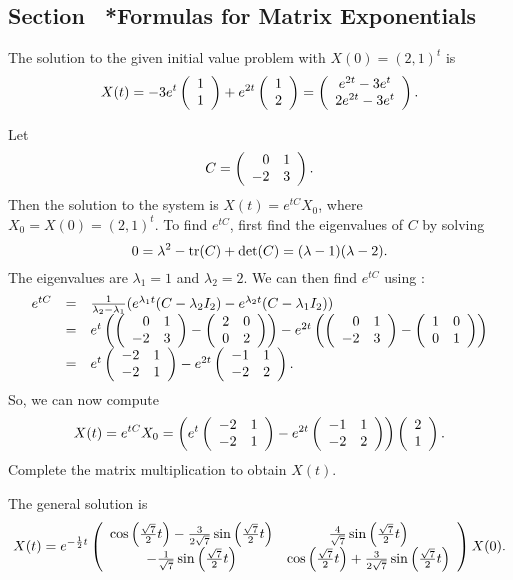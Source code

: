 \subsection*{Section~\protect{\ref{S:6.6}} *Formulas for Matrix Exponentials}

\ans The solution to the given initial value problem with $X(0) = (2,1)^t$
is
\[
X(t) = -3e^t\left(\begin{array}{r} 1 \\ 1\end{array}\right) + e^{2t}\left(\begin{array}{r} 1 \\ 2\end{array}\right)
= \left(\begin{array}{c} e^{2t} - 3e^t \\ 2e^{2t} - 3e^t\end{array}\right).
\]

\soln Let \[ C = \left(\begin{array}{rr} 0 & 1\\ -2 &3\end{array}\right). \]
Then the solution to the system is $X(t) = e^{tC}X_0$, where
$X_0 = X(0) = (2,1)^t$.
To find $e^{tC}$, first find the eigenvalues of $C$ by solving
\[
0 = \lambda^2 - {\rm tr}(C) + \det(C) = (\lambda - 1)(\lambda - 2).
\]
The eigenvalues are $\lambda_1 = 1$ and $\lambda_2 = 2$.  We can
then find $e^{tC}$ using :
\[
\begin{array}{rcl}
e^{tC} & = & \frac{1}{\lambda_2 - \lambda_1}(e^{\lambda_1 t}(C -
\lambda_2 I_2) - e^{\lambda_2 t}(C - \lambda_1 I_2)) \\
& = & e^t\left(\left(\begin{array}{rr} 0 & 1\\ -2 &3\end{array}\right) - \left(\begin{array}{rr} 2 & 0\\ 0 &2\end{array}\right)\right) -
e^{2t}\left(\left(\begin{array}{rr} 0 & 1\\ -2 &3\end{array}\right) - \left(\begin{array}{rr} 1 & 0\\ 0 &1\end{array}\right)\right) \\
& = &
e^t\left(\begin{array}{rr} -2 & 1\\ -2 &1\end{array}\right) - e^{2t}\left(\begin{array}{rr} -1 & 1\\ -2 &2\end{array}\right).
\end{array}
\]
So, we can now compute
\[
X(t) = e^{tC}X_0
= \left(e^t\left(\begin{array}{rr} -2 & 1\\ -2 &1\end{array}\right) -
e^{2t}\left(\begin{array}{rr} -1 & 1\\ -2 &2\end{array}\right)\right)\left(\begin{array}{r} 2 \\ 1\end{array}\right).
\]
Complete the matrix multiplication to obtain $X(t)$.

\ans The general solution is
\[
X(t) = e^{-\frac{1}{2}t}\left(\begin{array}{cc} \cos\left({\frac{\sqrt{7}}{2}t}\right) -
\frac{3}{2\sqrt{7}}\sin\left({\frac{\sqrt{7}}{2}t}\right) & \frac{4}{\sqrt{7}}\sin\left({\frac{\sqrt{7}}{2}t}\right)\\ -\frac{1}{\sqrt{7}}\sin\left({\frac{\sqrt{7}}{2}t}\right) &\cos\left({\frac{\sqrt{7}}{2}t}\right) +
\frac{3}{2\sqrt{7}}\sin\left({\frac{\sqrt{7}}{2}t}\right)\end{array}\right)X(0).
\]

